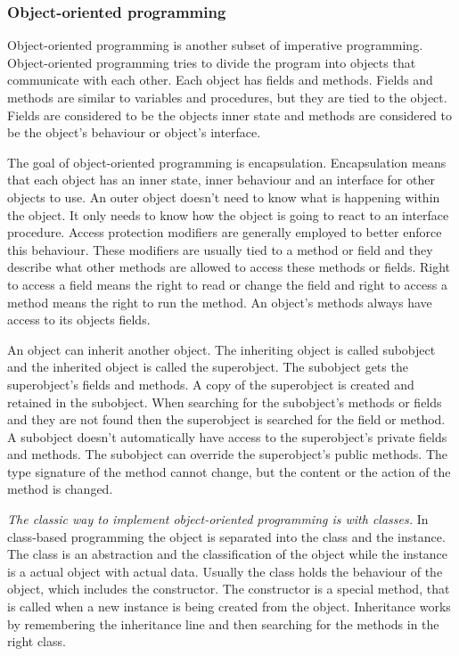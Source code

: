 \subsubsection{Object-oriented programming}
Object-oriented programming is another subset of imperative programming.
Object-oriented programming tries to divide the program into objects that
communicate with each other. Each object has fields and methods. Fields and
methods are similar to variables and procedures, but they are tied to the
object. Fields are considered to be the objects inner state and methods are
considered to be the object's behaviour or object's
interface.\cite{website:object-orientation}

The goal of object-oriented programming is encapsulation. Encapsulation means
that each object has an inner state, inner behaviour and an interface for other
objects to use. An outer object doesn't need to know what is happening within
the object. It only needs to know how the object is going to react to an
interface procedure. Access protection modifiers are generally employed to
better enforce this behaviour. These modifiers are usually tied to a method or
field and they describe what other methods are allowed to access these methods
or fields. Right to access a field means the right to read or change the field
and right to access a method means the right to run the
method. An object's methods always have access to its objects
fields.\cite{website:access-modifiers}

An object can inherit another object. The inheriting object is called subobject and the inherited object is called the superobject. The subobject gets the superobject's fields and methods. A copy of the superobject is created and retained in the subobject. When searching for the subobject's methods or fields and they are not found then the superobject is searched for the field or method. A subobject doesn't automatically have access to the superobject's private fields and methods. The subobject can override the superobject's public methods. The type signature of the method cannot change, but the content or the action of the method is changed.

\emph{The classic way to implement object-oriented programming is with classes.} In class-based programming the object is separated into the class and the instance. The class is an abstraction and the classification of the object while the instance is a actual object with actual data. Usually the class holds the behaviour of the object, which includes the constructor. The constructor is a special method, that is called when a new instance is being created from the object. Inheritance works by remembering the inheritance line and then searching for the methods in the right class.

